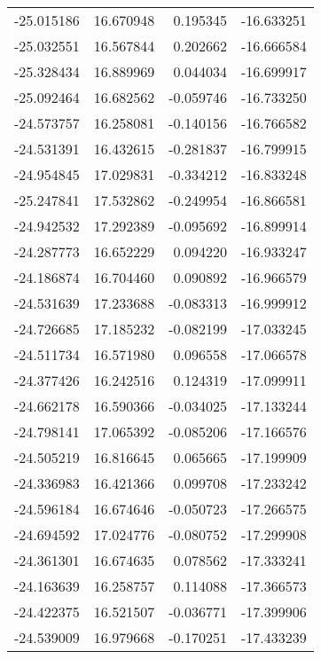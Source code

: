 \begin{tabular}{rrrr}
      -25.015186 &        16.670948 &    0.195345 & -16.633251 \\
      -25.032551 &        16.567844 &    0.202662 & -16.666584 \\
      -25.328434 &        16.889969 &    0.044034 & -16.699917 \\
      -25.092464 &        16.682562 &   -0.059746 & -16.733250 \\
      -24.573757 &        16.258081 &   -0.140156 & -16.766582 \\
      -24.531391 &        16.432615 &   -0.281837 & -16.799915 \\
      -24.954845 &        17.029831 &   -0.334212 & -16.833248 \\
      -25.247841 &        17.532862 &   -0.249954 & -16.866581 \\
      -24.942532 &        17.292389 &   -0.095692 & -16.899914 \\
      -24.287773 &        16.652229 &    0.094220 & -16.933247 \\
      -24.186874 &        16.704460 &    0.090892 & -16.966579 \\
      -24.531639 &        17.233688 &   -0.083313 & -16.999912 \\
      -24.726685 &        17.185232 &   -0.082199 & -17.033245 \\
      -24.511734 &        16.571980 &    0.096558 & -17.066578 \\
      -24.377426 &        16.242516 &    0.124319 & -17.099911 \\
      -24.662178 &        16.590366 &   -0.034025 & -17.133244 \\
      -24.798141 &        17.065392 &   -0.085206 & -17.166576 \\
      -24.505219 &        16.816645 &    0.065665 & -17.199909 \\
      -24.336983 &        16.421366 &    0.099708 & -17.233242 \\
      -24.596184 &        16.674646 &   -0.050723 & -17.266575 \\
      -24.694592 &        17.024776 &   -0.080752 & -17.299908 \\
      -24.361301 &        16.674635 &    0.078562 & -17.333241 \\
      -24.163639 &        16.258757 &    0.114088 & -17.366573 \\
      -24.422375 &        16.521507 &   -0.036771 & -17.399906 \\
      -24.539009 &        16.979668 &   -0.170251 & -17.433239 \\

\end{tabular}
